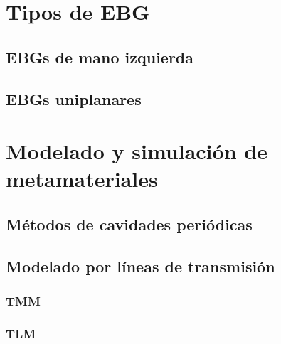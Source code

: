 \section{Tipos de EBG}
\label{sec_tipos_mtm}
\lipsum[1]
\subsection{EBGs de mano izquierda}
\label{subsec_ebg_izquierda}
\lipsum
\subsection{EBGs uniplanares}
\label{subsec_ebg_uniplanar}
\lipsum
\section{Modelado y simulación de metamateriales}
\label{sec_simulacion_mtm}
\lipsum
\subsection{Métodos de cavidades periódicas}
\label{subsec_eigenfunctions}
\lipsum
\subsection{Modelado por líneas de transmisión}
\lipsum

\subsubsection{TMM}
\lipsum[2]
\subsubsection{TLM}
\label{subsubsec_tlm}
\lipsum
